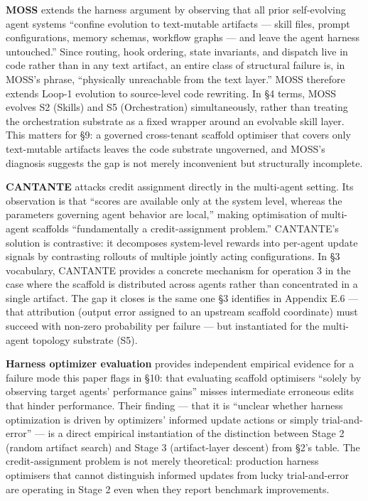 \textbf{MOSS} \citep{cai2026moss} extends the harness argument by
observing that all prior self-evolving agent systems ``confine evolution
to text-mutable artifacts --- skill files, prompt configurations, memory
schemas, workflow graphs --- and leave the agent harness untouched.''
Since routing, hook ordering, state invariants, and dispatch live in
code rather than in any text artifact, an entire class of structural
failure is, in MOSS's phrase, ``physically unreachable from the text
layer.'' MOSS therefore extends Loop-1 evolution to source-level code
rewriting. In §4 terms, MOSS evolves S2 (Skills) and S5 (Orchestration)
simultaneously, rather than treating the orchestration substrate as a
fixed wrapper around an evolvable skill layer. This matters for §9: a
governed cross-tenant scaffold optimiser that covers only text-mutable
artifacts leaves the code substrate ungoverned, and MOSS's diagnosis
suggests the gap is not merely inconvenient but structurally incomplete.

\textbf{CANTANTE} \citep{zehle2026cantante} attacks credit assignment
directly in the multi-agent setting. Its observation is that ``scores
are available only at the system level, whereas the parameters governing
agent behavior are local,'' making optimisation of multi-agent scaffolds
``fundamentally a credit-assignment problem.'' CANTANTE's solution is
contrastive: it decomposes system-level rewards into per-agent update
signals by contrasting rollouts of multiple jointly acting
configurations. In §3 vocabulary, CANTANTE provides a concrete mechanism
for operation 3 in the case where the scaffold is distributed across
agents rather than concentrated in a single artifact. The gap it closes
is the same one §3 identifies in Appendix E.6 --- that attribution
(output error assigned to an upstream scaffold coordinate) must succeed
with non-zero probability per failure --- but instantiated for the
multi-agent topology substrate (S5).

\textbf{Harness optimizer evaluation} \citep{ong2026harnesseval}
provides independent empirical evidence for a failure mode this paper
flags in §10: that evaluating scaffold optimisers ``solely by observing
target agents' performance gains'' misses intermediate erroneous edits
that hinder performance. Their finding --- that it is ``unclear whether
harness optimization is driven by optimizers' informed update actions or
simply trial-and-error'' --- is a direct empirical instantiation of the
distinction between Stage 2 (random artifact search) and Stage 3
(artifact-layer descent) from §2's table. The credit-assignment problem
is not merely theoretical: production harness optimisers that cannot
distinguish informed updates from lucky trial-and-error are operating in
Stage 2 even when they report benchmark improvements.

